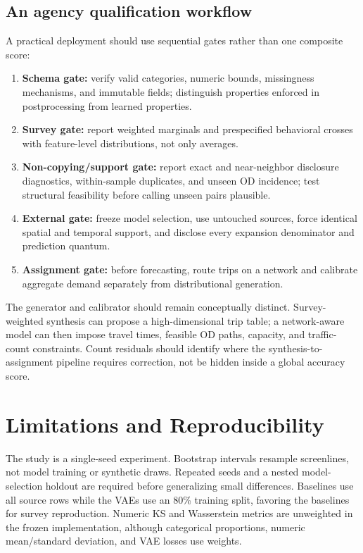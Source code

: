 \documentclass[numbered]{trbunofficial}
\begin{document}
\subsection{An agency qualification workflow}

A practical deployment should use sequential gates rather than one composite score:

\begin{enumerate}[leftmargin=0.27in,itemsep=2pt,topsep=3pt]
\item \textbf{Schema gate:} verify valid categories, numeric bounds, missingness mechanisms, and immutable fields; distinguish properties enforced in postprocessing from learned properties.
\item \textbf{Survey gate:} report weighted marginals and prespecified behavioral crosses with feature-level distributions, not only averages.
\item \textbf{Non-copying/support gate:} report exact and near-neighbor disclosure diagnostics, within-sample duplicates, and unseen OD incidence; test structural feasibility before calling unseen pairs plausible.
\item \textbf{External gate:} freeze model selection, use untouched sources, force identical spatial and temporal support, and disclose every expansion denominator and prediction quantum.
\item \textbf{Assignment gate:} before forecasting, route trips on a network and calibrate aggregate demand separately from distributional generation.
\end{enumerate}

The generator and calibrator should remain conceptually distinct. Survey-weighted synthesis can propose a high-dimensional trip table; a network-aware model can then impose travel times, feasible OD paths, capacity, and traffic-count constraints. Count residuals should identify where the synthesis-to-assignment pipeline requires correction, not be hidden inside a global accuracy score.

\section{Limitations and Reproducibility}

The study is a single-seed experiment. Bootstrap intervals resample screenlines, not model training or synthetic draws. Repeated seeds and a nested model-selection holdout are required before generalizing small differences. Baselines use all source rows while the VAEs use an 80\% training split, favoring the baselines for survey reproduction. Numeric KS and Wasserstein metrics are unweighted in the frozen implementation, although categorical proportions, numeric mean/standard deviation, and VAE losses use weights.
\end{document}
